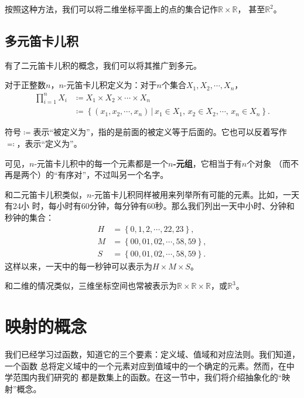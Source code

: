 按照这种方法，我们可以将二维坐标平面上的点的集合记作$\mathbb{R}\times\mathbb{R}$，
甚至$\mathbb{R}^2$。

\subsection{多元笛卡儿积}

有了二元笛卡儿积的概念，我们可以将其推广到多元。

\begin{rawdef}[$n$-元笛卡儿积]
    对于正整数$n$，$n$-元笛卡儿积定义为：对于$n$个集合$X_{1},X_{2},\cdots,X_{n}$，
    \begin{align*}
        \prod_{i=1}^n X_{i}&\coloneq X_{1}\times X_{2}\times \cdots \times X_{n} \\
                           &\coloneq \left\{ \left( x_{1},x_{2},\cdots,x_{n} 
                               \right) \,|\, x_{1} \in X_{1},\, x_{2}\in X_{2},
                           \cdots,\,x_{n}\in X_{n}\right\}.
    \end{align*}
\end{rawdef}

符号$\coloneq$表示“被定义为”，指的是前面的被定义等于后面的。它也可以反着写作
$\eqcolon$，表示“定义为”。

可见，$n$-元笛卡儿积中的每一个元素都是一个\textbf{$n$-元组}，它相当于有$n$个对象
（而不再是两个）的“有序对”，不过叫另一个名字。

和二元笛卡儿积类似，$n$-元笛卡儿积同样被用来列举所有可能的元素。比如，一天有24小
时，每小时有60分钟，每分钟有60秒。那么我们列出一天中小时、分钟和秒钟的集合：
\begin{align*}
    H &= \left\{ 0,1,2,\cdots,22,23 \right\},\\
    M &= \left\{ 00,01,02,\cdots,58,59 \right\},\\
    S &= \left\{ 00,01,02,\cdots,58,59 \right\}.
\end{align*}
这样以来，一天中的每一秒钟可以表示为$H\times M\times S$。

和二维的情况类似，三维坐标空间也常被表示为$\mathbb{R}\times\mathbb{R}
\times\mathbb{R}$，或$\mathbb{R}^3$。

\section{映射的概念}

我们已经学习过函数，知道它的三个要素：定义域、值域和对应法则。我们知道，一个函数
总将定义域中的一个元素对应到值域中的一个确定的元素。然而，在中学范围内我们研究的
都是数集上的函数。在这一节中，我们将介绍抽象化的“映射”概念。

